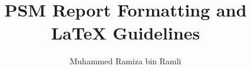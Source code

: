 \documentclass[english]{umpthesis}
\author{Muhammed Ramiza bin Ramli}
\title{PSM Report Formatting and LaTeX Guidelines}
\begin{document}
    \umpCoverPage

    \frontmatter

    \maketitle

    
    

    \tableofcontents

    \listoftables

    \mainmatter

    
    
    
    
    

    
    
\end{document}
